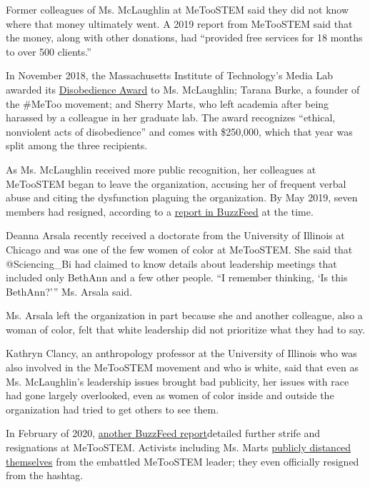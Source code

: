 Former colleagues of Ms. McLaughlin at MeTooSTEM said they did not know
where that money ultimately went. A 2019 report from MeTooSTEM said that
the money, along with other donations, had ``provided free services for
18 months to over 500 clients.''

In November 2018, the Massachusetts Institute of Technology's Media Lab
awarded its
\href{http://news.mit.edu/2019/call-for-nominations-media-lab-disobedience-award-0529}{Disobedience
Award} to Ms. McLaughlin; Tarana Burke, a founder of the \#MeToo
movement; and Sherry Marts, who left academia after being harassed by a
colleague in her graduate lab. The award recognizes ``ethical,
nonviolent acts of disobedience'' and comes with \$250,000, which that
year was split among the three recipients.

As Ms. McLaughlin received more public recognition, her colleagues at
MeTooSTEM began to leave the organization, accusing her of frequent
verbal abuse and citing the dysfunction plaguing the organization. By
May 2019, seven members had resigned, according to a
\href{https://www.buzzfeednews.com/article/peteraldhous/metoostem-sexual-harassment-science?bfsource=relatedmanual}{report
in BuzzFeed} at the time.

Deanna Arsala recently received a doctorate from the University of
Illinois at Chicago and was one of the few women of color at MeTooSTEM.
She said that @Sciencing\_Bi had claimed to know details about
leadership meetings that included only BethAnn and a few other people.
``I remember thinking, `Is this BethAnn?''' Ms. Arsala said.

Ms. Arsala left the organization in part because she and another
colleague, also a woman of color, felt that white leadership did not
prioritize what they had to say.

Kathryn Clancy, an anthropology professor at the University of Illinois
who was also involved in the MeTooSTEM movement and who is white, said
that even as Ms. McLaughlin's leadership issues brought bad publicity,
her issues with race had gone largely overlooked, even as women of color
inside and outside the organization had tried to get others to see them.

In February of 2020,
\href{https://www.buzzfeednews.com/article/peteraldhous/bethann-mclaughlin-metoostem-resignation-harassment}{another
BuzzFeed report}detailed further strife and resignations at MeTooSTEM.
Activists including Ms. Marts
\href{https://twitter.com/sherrymarts/status/1231059406328074240?ref_src=twsrc\%5Etfw\%7Ctwcamp\%5Etweetembed\%7Ctwterm\%5E1231059406328074240\%7Ctwgr\%5E\&ref_url=https\%3A\%2F\%2Fwww.buzzfeednews.com\%2Farticle\%2Fpeteraldhous\%2Fbethann-mclaughlin-metoostem-resignation-harassment}{publicly
distanced themselves} from the embattled MeTooSTEM leader; they even
officially resigned from the hashtag.

